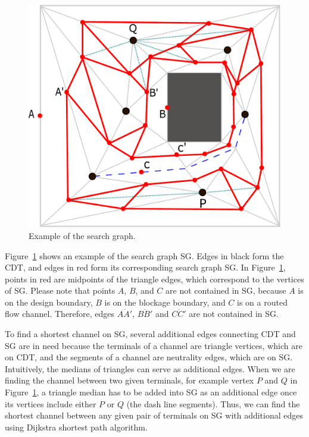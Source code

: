 \documentclass[journal]{IEEEtran}
\begin{document}
\begin{figure}[htbp]
\centering
\includegraphics[width=0.9\columnwidth, angle=0]{./Figs/DTGExampleF.pdf}
\vspace{-0.15cm}
\caption{Example of the search graph.}
\label{fig:DTGExampleF}
\end{figure}


Figure~\ref{fig:DTGExampleF} shows an example of the search graph SG. 
Edges in black form the CDT, and edges in red form its corresponding search graph SG. 
In Figure~\ref{fig:DTGExampleF}, points in red are midpoints of the 
triangle edges, which correspond to the vertices of SG. 
Please note that points $A$, $B$, and $C$ are not contained in SG, 
because $A$ is on the design boundary, $B$ is on the blockage boundary, 
and $C$ is on a routed flow channel. Therefore, edges $\overline{AA'}$, 
$\overline{BB'}$ and $\overline{CC'}$ are not contained in SG. 


To find a shortest channel on SG, several 
additional edges connecting CDT and SG are in need because the terminals of a channel are 
triangle vertices, which are on CDT, and the segments of a channel are neutrality edges, 
which are on SG. 
Intuitively, the medians of triangles can serve as additional edges. 
When we are finding the channel between two given terminals, for example vertex $P$ and $Q$ in 
Figure~\ref{fig:DTGExampleF}, a triangle median has to be added into SG as an additional edge once its vertices include either $P$ or $Q$ (the dash line segments). Thus, we can find the shortest channel between any given pair of terminals on SG with additional edges using Dijkstra shortest path algorithm.
\end{document}
